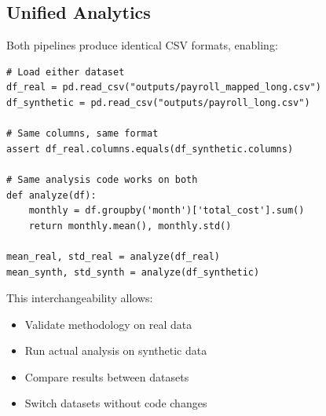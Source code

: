 \subsection{Unified Analytics}

Both pipelines produce identical CSV formats, enabling:

\begin{lstlisting}[style=pythonstyle]
# Load either dataset
df_real = pd.read_csv("outputs/payroll_mapped_long.csv")
df_synthetic = pd.read_csv("outputs/payroll_long.csv")

# Same columns, same format
assert df_real.columns.equals(df_synthetic.columns)

# Same analysis code works on both
def analyze(df):
    monthly = df.groupby('month')['total_cost'].sum()
    return monthly.mean(), monthly.std()

mean_real, std_real = analyze(df_real)
mean_synth, std_synth = analyze(df_synthetic)
\end{lstlisting}

This interchangeability allows:
\begin{itemize}
    \item Validate methodology on real data
    \item Run actual analysis on synthetic data
    \item Compare results between datasets
    \item Switch datasets without code changes
\end{itemize}
